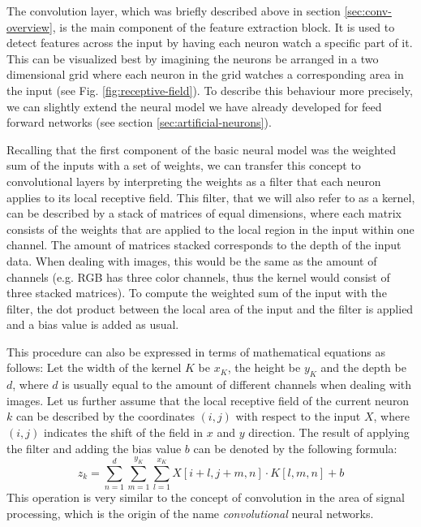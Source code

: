 The convolution layer, which was briefly described above in section
\ref{sec:conv-overview}, is the main
component of the feature extraction block. It is used to detect
features across the input by having each neuron watch a specific part
of it. This can be visualized best by imagining the neurons be
arranged in a two dimensional grid where each neuron in the grid
watches a corresponding area in the input (see
Fig. \ref{fig:receptive-field}). To describe
this behaviour more precisely, we can slightly extend the neural model
we have already developed for feed forward networks (see section
\ref{sec:artificial-neurons}).

Recalling that the first component of the basic neural model was the
weighted sum of the inputs with a set of weights, we can transfer this
concept to convolutional layers by interpreting the weights as a
filter that each neuron applies to its local receptive field. This
filter, that we will also refer to as a kernel, can be described by a
stack of matrices of equal dimensions, where each matrix consists of
the weights that are applied to the local region in the input within
one channel. The amount of matrices stacked corresponds to the depth
of the input data. When dealing with images, this would be the same as
the amount of channels (e.g. RGB has three color channels, thus the
kernel would consist of three stacked matrices). To compute the
weighted sum of the input with the filter, the dot product between the
local area of the input and the filter is applied and a bias value is
added as usual.

This procedure can also be expressed in terms of mathematical
equations as follows: Let the width of the kernel \(K\) be \(x_K\), the
height be \(y_K\) and the depth be \(d\), where \(d\) is usually equal
to the amount of different channels when dealing with images. Let us
further assume that the local receptive field of the current neuron
\(k\) can be described by the coordinates \((i, j)\) with respect to
the input \(X\), where \((i, j)\) indicates the shift of the field in
\(x\) and \(y\) direction. The result of applying the filter and
adding the bias value \(b\) can be denoted by the following formula:
\begin{equation}
  \label{Eq:convolution}
  z_k = \sum_{n=1}^{d}{\sum_{m=1}^{y_K}{\sum_{l=1}^{x_K}{X[i+l, j+m, n] \cdot
        K[l, m, n]}}} + b
\end{equation}
This operation is very similar to the concept of convolution in the
area of signal processing, which is the origin of the name
\textit{convolutional} neural networks.

